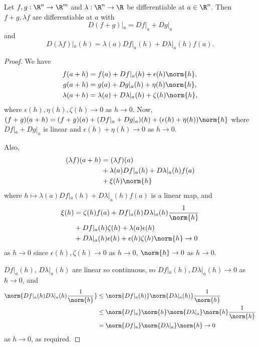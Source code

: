 \begin{proposition} \label{prp:2.4}
    Let $f,g: \R^n\to \R^m$ and $\lambda:\R^n\to\R$ be differentiable at $a\in \R^n$. 
    Then $f+g, \lambda f$ are differentiable at $a$ with \[ D(f+g)|_a = Df|_a + Dg|_a \] and \[ D(\lambda f)|_a(h) = \lambda (a) Df|_a(h) + D\lambda |_a(h) f(a). \]
\end{proposition}

\begin{proof}
    We have 
    \begin{align*}
        f(a+h) &= f(a) + Df|_a(h) + \epsilon(h) \norm{h}, \\
        g(a+h) &= g(a) + Dg|_a(h) + \eta(h) \norm{h}, \\
        \lambda(a+h) &= \lambda(a) + D\lambda |_a(h) + \zeta(h) \norm{h},
    \end{align*}
    where $\epsilon(h), \eta(h), \zeta(h) \to 0$ as $h\to 0$. 
    Now, $(f+g)(a+h) = (f+g)(a) + (Df|_a + Dg|_a)(h) + (\epsilon(h) +\eta(h)) \norm{h}$ where $Df|_a + Dg|_a$ is linear and $\epsilon(h) + \eta(h)\to 0$ as $h\to 0$. 

    Also,
    \begin{align*}
        (\lambda f)(a+h) &= (\lambda f)(a) \\
        &+ \lambda(a) Df|_a(h) + D\lambda|_a(h) f(a)\\
        &+ \xi(h)\norm{h}
    \end{align*}
    where $h\mapsto \lambda(a) Df|_a(h) + D\lambda|_a(h) f(a)$ is a linear map, and 
    \begin{align*}
        \xi(h) &= \zeta(h)f(a) + Df|_a(h)D\lambda |_a(h) \frac{1}{\norm{h}}\\
        &+ Df|_a(h)\zeta(h) + \lambda (a)\epsilon(h) \\
        &+ D\lambda |_a(h)\epsilon(h) +\epsilon(h) \zeta(h) \norm{h} \to 0
    \end{align*}
    as $h\to 0$ since $\epsilon(h), \zeta(h) \to 0$ as $h\to 0$, $\norm{h}\to 0$ as $h\to 0$.

    $Df|_a(h)$, $D\lambda |_a(h)$ are linear so continuous, so $Df|_a(h), D\lambda |_a(h)\to 0$ as $h\to 0$, and 
    \begin{align*}
        \norm{Df|_a(h)D\lambda |_a(h) \frac{1}{\norm{h}}} &\leq \norm{Df|_a(h)} \norm{D\lambda |_a(h)}\frac{1}{\norm{h}}\\
        &\leq \norm{Df|_a}\norm{h} \norm{D\lambda |_a}\norm{h} \frac{1}{\norm{h}}\\
        & = \norm{Df|_a} \norm{D\lambda |_a} \norm{h}\to 0
    \end{align*}
    as $h\to 0$, as required.
\end{proof}

